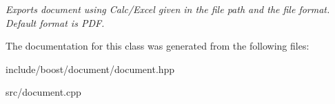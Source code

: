 \begin{DoxyCompactItemize}
\begin{DoxyCompactList}\small\item\em Exports document using Calc/\-Excel given in the file path and the file format. Default format is P\-D\-F. \end{DoxyCompactList}\end{DoxyCompactItemize}


The documentation for this class was generated from the following files\-:\begin{DoxyCompactItemize}
\item 
include/boost/document/document.\-hpp\item 
src/document.\-cpp\end{DoxyCompactItemize}
